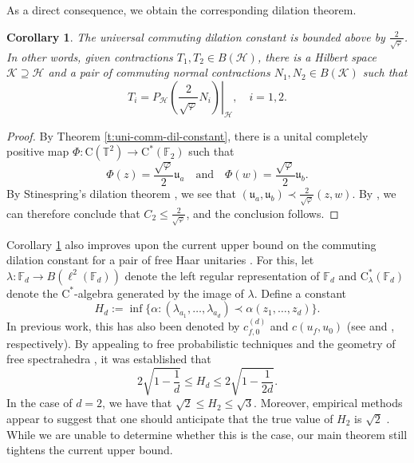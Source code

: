 \documentclass[10pt]{amsart}
\newcommand{\bF}{{\mathbb{F}}}
\newcommand{\bT}{{\mathbb{T}}}
\renewcommand{\H}{{\mathcal{H}}}
\newcommand{\K}{{\mathcal{K}}}
\newcommand{\rC}{\mathrm{C}}
\renewcommand{\phi}{\varphi}
\newtheorem{corollary}[theorem]{Corollary}
\begin{document}
As a direct consequence, we obtain the corresponding dilation theorem.

\begin{corollary}\label{c:uni-comm-dilation}
    The universal commuting dilation constant is bounded above by $\frac{2}{\sqrt{\phi}}$. In other words, given contractions $T_1, T_2\in B(\H)$, there is a Hilbert space $\K\supseteq \H$ and a pair of commuting normal contractions $N_1,N_2\in B(\K)$ such that
    \[
        T_i =  P_\H \left(\left.\frac{2}{\sqrt{\phi}}N_i\right)\right|_\H, \quad i=1,2.
    \]
\end{corollary}

\begin{proof}
    By Theorem \ref{t:uni-comm-dil-constant}, there is a unital completely positive map $\Phi:\rC(\bT^2)\rightarrow\rC^*(\bF_2)$ such that
    \[
        \Phi(z) = \frac{\sqrt{\phi}}{2} \mathfrak{u}_a \quad \text{and} \quad \Phi(w) = \frac{\sqrt{\phi}}{2}\mathfrak{u}_b.
    \]
    By Stinespring's dilation theorem \cite{stinespring1955positive}, we see that $(\mathfrak{u}_a,\mathfrak{u}_b)\prec \frac{2}{\sqrt{\phi}}(z,w)$. By \cite[Remark 1.2]{gerhold2021dilations}, we can therefore conclude that $C_2 \leq \frac{2}{\sqrt{\varphi}}$, and the conclusion follows.
\end{proof}

Corollary \ref{c:uni-comm-dilation} also improves upon the current upper bound on the commuting dilation constant for a pair of free Haar unitaries  \cites{gerhold2021dilations, gerhold2025empirical}. For this, let $\lambda:\bF_d\rightarrow B(\ell^2(\bF_d))$ denote the left regular representation of $\bF_d$ and $\rC^*_\lambda(\bF_d)$ denote the $\rC^*$-algebra generated by the image of $\lambda$. Define a constant
\[
    H_d:=\inf\{\alpha : (\lambda_{a_1},\ldots,\lambda_{a_d})\prec \alpha(z_1,\ldots, z_d)\}.
\]
In previous work, this has also been denoted by $c_{f,0}^{(d)}$ and $c(u_f, u_0)$ (see \cite{gerhold2021dilations} and \cite{gerhold2025empirical}, respectively). By appealing to free probabilistic techniques and the geometry of free spectrahedra \cite[Theorems 3.9 and 3.10]{gerhold2021dilations}, it was established that
\[
    2\sqrt{1-\frac{1}{d}} \leq H_d \leq 2 \sqrt{1-\frac{1}{2d}}.
\]
In the case of $d=2$, we have that $\sqrt{2}\leq H_2 \leq \sqrt{3}$. Moreover, empirical methods appear to suggest that one should anticipate that the true value of $H_2$ is $\sqrt{2}$ \cite{gerhold2025empirical}. While we are unable to determine whether this is the case, our main theorem still tightens the current upper bound.
\end{document}
